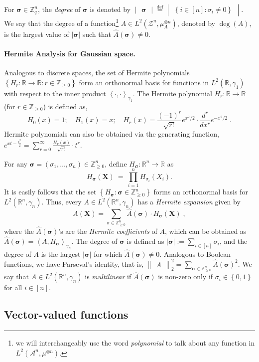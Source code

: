 \documentclass[11pt]{article}
\newcommand{\inbrace}[1]{\left \{ #1 \right \}}
\newcommand{\inangle}[1]{\left \langle #1 \right \rangle}
\newcommand{\inabs}[1]{\begin{vmatrix} #1 \end{vmatrix}}
\newcommand{\norm}[2]{\begin{Vmatrix} #2 \end{Vmatrix}_{#1}}
\newcommand{\set}[1]{\inbrace{#1}}
\newcommand{\setdef}[2]{\set{#1 : #2}}
\newcommand{\defeq}{\stackrel{\mathrm{def}}{=}}
\newcommand{\bit}{\set{0,1}}
\newcommand{\what}[1]{\widehat{#1}}
\newcommand{\bbR}{{\mathbb R}}
\newcommand{\bbZ}{{\mathbb Z}}
\newcommand{\bX}{\mathbf{X}}
\newcommand{\bsigma}{{\boldsymbol \sigma}}
\newcommand{\calA}{\mathcal{A}}
\newcommand{\calZ}{\mathcal{Z}}
\begin{document}
For $\bsigma \in \mathbb{Z}_q^n$, the {\em degree} of $\bsigma$ is denoted by $\inabs{\bsigma} \defeq \inabs{\setdef{i \in [n]}{\sigma_i \neq 0}}$. We say that the degree of a function\footnote{we will interchangeably use the word {\em polynomial} to talk about any function in $L^2(\calA^n, \mu^{\otimes n})$.} $A \in L^2(\calZ^n, \mu_A^{\otimes n})$, denoted by $\deg(A)$, is the largest value of $|\bsigma|$ such that $\what{A}(\bsigma) \ne 0$.

\paragraph{Hermite Analysis for Gaussian space.} Analogous to discrete spaces, the set of Hermite polynomials $\setdef{H_r : \bbR \to \bbR}{r \in \bbZ_{\ge 0}}$ form an orthonormal basis for functions in $L^2(\bbR, \gamma_1)$ with respect to the inner product $\inangle{\cdot, \cdot}_{\gamma_1}$. The Hermite polynomial $H_r : \bbR \to \bbR$ (for $r \in \bbZ_{\ge 0}$) is defined as,
\[ H_0(x) = 1; \quad H_1(x) = x; \quad H_r(x) = \frac{(-1)^r}{\sqrt{r!}} e^{x^2/2} \cdot \frac{d^r}{dx^r}e^{-x^2/2}\;. \]
Hermite polynomials can also be obtained via the generating function, $e^{xt - \frac{t^2}{2}} = \sum_{r=0}^{\infty} \frac{H_r(x)}{\sqrt{r!}} \cdot t^r$.

\noindent For any $\bsigma = (\sigma_1, \ldots, \sigma_n) \in \bbZ_{\ge 0}^n$, define $H_\bsigma : \bbR^n \to \bbR$ as
\[ H_\bsigma(\bX) ~=~ \prod_{i=1}^{n} H_{\sigma_i}(X_i).\]
It is easily follows that the set $\setdef{H_\bsigma}{\bsigma \in \bbZ_{\ge 0}^n}$ forms an orthonormal basis for $L^2(\bbR^n, \gamma_n)$. Thus, every $A \in L^2(\bbR^n, \gamma_n)$ has a {\em Hermite expansion} given by
\[ A(\bX) = \sum_{\sigma \in \bbZ_{\ge 0}^n} \what{A}(\bsigma) \cdot H_{\bsigma}(\bX)\;, \]
where the $\what{A}(\bsigma)$'s are the {\em Hermite coefficients} of $A$, which can be obtained as $\what{A}(\bsigma) = \inangle{A,H_{\bsigma}}_{\gamma_n}$. The degree of $\bsigma$ is defined as $|\bsigma| := \sum_{i \in [n]} \sigma_i$, and the degree of $A$ is the largest $|\bsigma|$ for which $\what{A}(\bsigma) \ne 0$. Analogous to Boolean functions, we have Parseval's identity, that is, $\norm{2}{A}^2 = \sum_{\bsigma \in \bbZ_{\ge 0}^n} \what{A}(\bsigma)^2$. We say that $A \in L^2(\bbR^n, \gamma_n)$ is {\em multilinear} if $\what{A}(\bsigma)$ is non-zero only if $\sigma_i \in \bit$ for all $i \in [n]$.

\subsection{Vector-valued functions}
\end{document}
